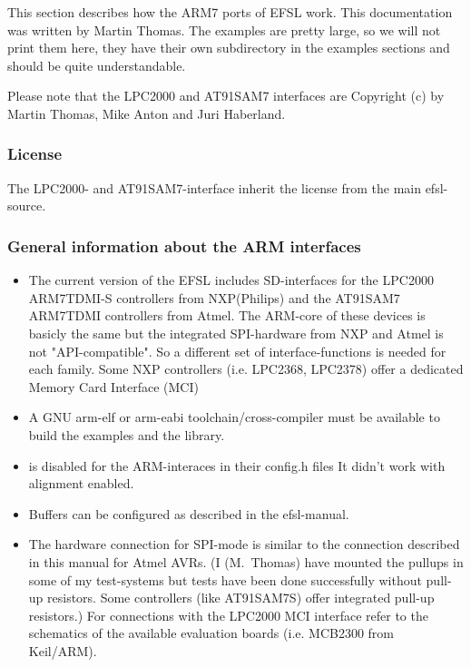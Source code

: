 This section describes how the ARM7 ports of EFSL work. This documentation was written
by Martin Thomas.
The examples are pretty large, so we will not print them here, they have their own
subdirectory in the examples sections and should be quite understandable.

Please note that the LPC2000 and AT91SAM7 interfaces are Copyright (c) by Martin Thomas, Mike Anton and Juri Haberland.

\subsubsection{License}
The LPC2000- and AT91SAM7-interface inherit the license from the main efsl-source.

\subsubsection{General information about the ARM interfaces}
	\begin{itemize}
	
\item The current version of the EFSL includes SD-interfaces
for the LPC2000 ARM7TDMI-S controllers from NXP(Philips) and 
the AT91SAM7 ARM7TDMI controllers from Atmel. The ARM-core 
of these devices is basicly the same but the integrated
SPI-hardware from NXP and Atmel is not "API-compatible". So
a different set of interface-functions is needed for each
family. Some NXP controllers (i.e. LPC2368, LPC2378) offer a 
dedicated Memory Card Interface (MCI)

\item A GNU arm-elf or arm-eabi toolchain/cross-compiler
must be available to build the examples and the library.

\item {} is disabled
for the ARM-interaces in their config.h files
It didn't work with alignment enabled.

\item Buffers can be configured as
described in the efsl-manual.

\item The hardware connection for SPI-mode is similar 
to the connection described
in this manual for Atmel AVRs.
(I (M.~Thomas) have mounted the pullups in some of my
test-systems but tests have been done 
successfully without pull-up resistors.
Some controllers (like AT91SAM7S) offer integrated pull-up
resistors.) For connections with the LPC2000 MCI interface
refer to the schematics of the available evaluation boards
(i.e. MCB2300 from Keil/ARM).
	\end{itemize}

